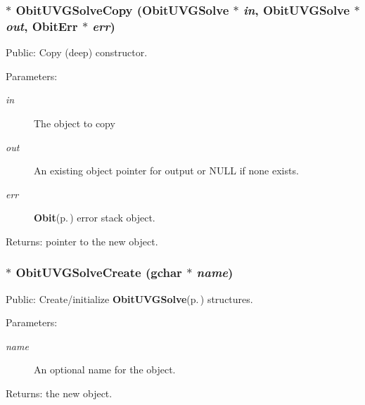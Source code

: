 \subsubsection{$\ast$ Obit\-UVGSolve\-Copy ({\bf Obit\-UVGSolve} $\ast$ {\em in}, {\bf Obit\-UVGSolve} $\ast$ {\em out}, {\bf Obit\-Err} $\ast$ {\em err})}\label{ObitUVGSolve_8c_a14}


Public: Copy (deep) constructor. 

\begin{Desc}
\item[Parameters:]
\begin{description}
\item[{\em in}]The object to copy \item[{\em out}]An existing object pointer for output or NULL if none exists. \item[{\em err}]{\bf Obit}{\rm (p.\,\pageref{structObit})} error stack object. \end{description}
\end{Desc}
\begin{Desc}
\item[Returns:]pointer to the new object. \end{Desc}
\subsubsection{$\ast$ Obit\-UVGSolve\-Create (gchar $\ast$ {\em name})}\label{ObitUVGSolve_8c_a16}


Public: Create/initialize {\bf Obit\-UVGSolve}{\rm (p.\,\pageref{structObitUVGSolve})} structures. 

\begin{Desc}
\item[Parameters:]
\begin{description}
\item[{\em name}]An optional name for the object. \end{description}
\end{Desc}
\begin{Desc}
\item[Returns:]the new object. \end{Desc}
